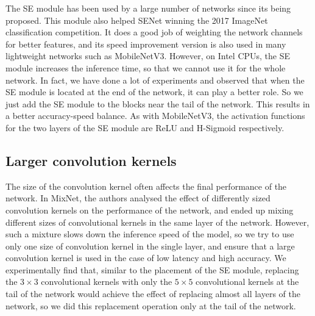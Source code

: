 \documentclass[final]{cvpr}
\begin{document}
The SE module\cite{senet} has been used by a large number of networks since its being proposed. This module also helped SENet\cite{senet} winning the 2017 ImageNet\cite{imagenet} classification competition. It does a good job of weighting the network channels for better features, and its speed improvement version is also used in many lightweight networks such as MobileNetV3\cite{mbv3}. However, on Intel CPUs, the SE module\cite{senet} increases the inference time, so that we cannot use it for the whole network. In fact, we have done a lot of experiments and observed that when the SE module\cite{senet} is located at the end of the network, it can play a better role. So we just add the SE module\cite{senet} to the blocks near the tail of the network. This results in a better accuracy-speed balance. As with MobileNetV3\cite{mbv3}, the activation functions for the two layers of the SE module\cite{senet} are ReLU and H-Sigmoid respectively.


\subsection{Larger convolution kernels}
The size of the convolution kernel often affects the final performance of the network. In MixNet\cite{mixnet}, the authors analysed the effect of differently sized convolution kernels on the performance of the network, and ended up mixing different sizes of convolutional kernels in the same layer of the network.  However, such a mixture slows down the inference speed of the model,  so we try to use only one size of convolution kernel in the single layer, and ensure that a large convolution kernel is used in the case of low latency and high accuracy. We experimentally find that, similar to the placement of the SE module\cite{senet}, replacing the $3\times3$ convolutional kernels with only the $5\times5$ convolutional kernels at the tail of the network would achieve the effect of replacing almost all layers of the network, so we did this replacement operation only at the tail of the network.
\end{document}
